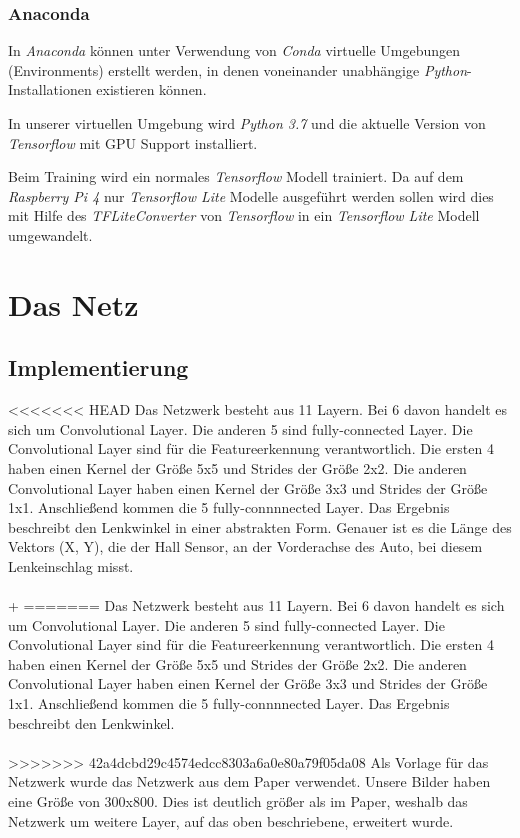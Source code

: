 \documentclass[a4paper, 12pt]{scrartcl}
\begin{document}
			\subsubsection{Anaconda}
			In \emph{Anaconda} können unter Verwendung von \emph{Conda} virtuelle Umgebungen (Environments) erstellt werden, in denen voneinander unabhängige \emph{Python}-Installationen existieren können. 
			
			In unserer virtuellen Umgebung wird \emph{Python 3.7} und die aktuelle Version von \emph{Tensorflow} mit GPU Support installiert.
			
			Beim Training wird ein normales \emph{Tensorflow} Modell trainiert. Da auf dem  \emph{Raspberry Pi 4} nur \emph{Tensorflow Lite} Modelle ausgeführt werden sollen wird dies mit Hilfe des \emph{TFLiteConverter} von  \emph{Tensorflow}  in ein \emph{Tensorflow Lite} Modell umgewandelt.
			
	
			
		\section{Das Netz}
			\subsection{Implementierung}
<<<<<<< HEAD
			Das Netzwerk besteht aus 11 Layern. Bei 6 davon handelt es sich um Convolutional Layer. Die anderen 5 sind fully-connected Layer. Die Convolutional Layer sind für die Featureerkennung verantwortlich. Die ersten 4 haben einen Kernel der Größe 5x5 und Strides der Größe 2x2. Die anderen Convolutional Layer haben einen Kernel der Größe 3x3 und Strides der Größe 1x1. Anschließend kommen die 5 fully-connnnected Layer. Das Ergebnis beschreibt den Lenkwinkel in einer abstrakten Form. Genauer ist es die Länge des Vektors (X, Y), die der Hall Sensor, an der Vorderachse des Auto, bei diesem Lenkeinschlag misst.\\ \\+
=======
			Das Netzwerk besteht aus 11 Layern. Bei 6 davon handelt es sich um Convolutional Layer. Die anderen 5 sind fully-connected Layer. Die Convolutional Layer sind für die Featureerkennung verantwortlich. Die ersten 4 haben einen Kernel der Größe 5x5 und Strides der Größe 2x2. Die anderen Convolutional Layer haben einen Kernel der Größe 3x3 und Strides der Größe 1x1. Anschließend kommen die 5 fully-connnnected Layer. Das Ergebnis beschreibt den Lenkwinkel. \\ \\
>>>>>>> 42a4dcbd29c4574edcc8303a6a0e80a79f05da08
			Als Vorlage für das Netzwerk wurde das Netzwerk aus dem Paper \cite{article} verwendet. Unsere Bilder haben eine Größe von 300x800. Dies ist deutlich größer als im Paper, weshalb das Netzwerk um weitere Layer, auf das oben beschriebene, erweitert wurde.
		
\end{document}
